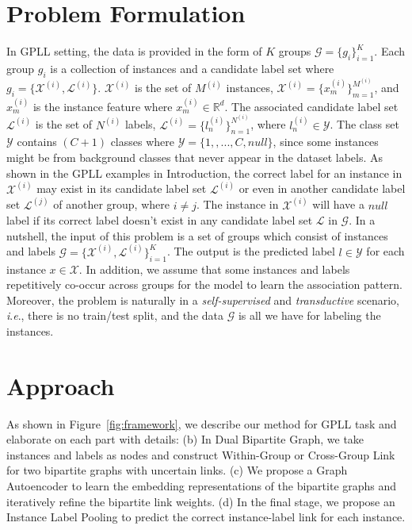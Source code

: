 \documentclass[letterpaper]{article} \usepackage{aaai20}  \usepackage{times}  \usepackage{helvet} \usepackage{courier}  \usepackage[hyphens]{url}  \usepackage{graphicx} \urlstyle{rm} \def\UrlFont{\rm}  \frenchspacing  \setlength{\pdfpagewidth}{8.5in}  \setlength{\pdfpageheight}{11in}  \frenchspacing
\newcommand{\ie}{\textit{i}.\textit{e}.}
\begin{document}
\section{Problem Formulation}


In GPLL setting, the data is provided in the form of  $K$ groups $\mathcal{G}  =\{g_i\}^K_{i=1}$. Each group $g_i$ is a collection of instances and a candidate label set where $g_i = \{\mathcal{X}^{(i)},\mathcal{L}^{(i)}\}$. $\mathcal{X}^{(i)}$ is the set of $M^{(i)}$ instances, $\mathcal{X}^{(i)} = \{x^{(i)}_m\}^{M^{(i)}}_{m=1}$, and $x^{(i)}_m$ is the instance feature where $x^{(i)}_m \in \mathbb{R}^d$. The associated candidate label set $\mathcal{L}^{(i)}$ is the set of $N^{(i)}$ labels, $\mathcal{L}^{(i)} = \{l^{(i)}_n\}^{N^{(i)}}_{n=1}$,  where $l^{(i)}_n \in \mathcal{Y}$.
The class set $\mathcal{Y}$ contains $(C+1)$ classes where $\mathcal{Y} = \{1, ,..., C, null\}$, since some instances might be from background classes that never appear in the dataset labels. As shown in the GPLL examples in Introduction, the correct label for an instance in $\mathcal{X}^{(i)}$ may exist in its candidate label set $\mathcal{L}^{(i)}$ or even in another candidate label set $\mathcal{L}^{(j)}$ of another group, where $i\neq j$. The instance in $\mathcal{X}^{(i)}$ will have a $null$ label if its correct label doesn't exist in any candidate label set $\mathcal{L}$ in $\mathcal{G}$.
In a nutshell, the input of this problem is a set of groups which consist of instances and labels $\mathcal{G}=\{\mathcal{X}^{(i)},\mathcal{L}^{(i)}\}^{K}_{i=1}$. The output is the predicted label $l \in \mathcal{Y}$ for each instance $x \in \mathcal{X}$. In addition, we assume that some instances and labels repetitively co-occur across groups for the model to learn the association pattern. Moreover, the problem is naturally in a \emph{self-supervised} and \emph{transductive} scenario, \ie, there is no train/test split, and the data $\mathcal{G}$ is all we have for labeling the instances.




\section{Approach}




As shown in Figure~\ref{fig:framework}, we describe our method for GPLL task and elaborate on each part with details: (b) In Dual Bipartite Graph, we take instances and labels as nodes and construct Within-Group or Cross-Group Link for two bipartite graphs with uncertain links. (c) We propose a Graph Autoencoder to learn the embedding representations of the bipartite graphs and iteratively refine the bipartite link weights. 
(d) In the final stage, we propose an Instance Label Pooling to predict the correct instance-label link for each instance.
\end{document}
